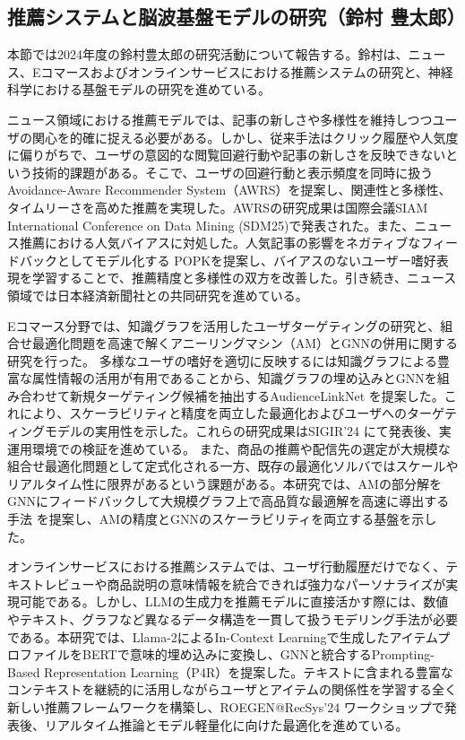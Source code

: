 
\subsection{推薦システムと脳波基盤モデルの研究（鈴村 豊太郎）}


本節では2024年度の鈴村豊太郎の研究活動について報告する。鈴村は、ニュース、Eコマースおよびオンラインサービスにおける推薦システムの研究と、神経科学における基盤モデルの研究を進めている。

ニュース領域における推薦モデルでは、記事の新しさや多様性を維持しつつユーザの関心を的確に捉える必要がある。しかし、従来手法はクリック履歴や人気度に偏りがちで、ユーザの意図的な閲覧回避行動や記事の新しさを反映できないという技術的課題がある。そこで、ユーザの回避行動と表示頻度を同時に扱う Avoidance-Aware Recommender System（AWRS）\cite{awrs}を提案し、関連性と多様性、タイムリーさを高めた推薦を実現した。AWRSの研究成果は国際会議SIAM International Conference on Data Mining (SDM25)で発表された。また、ニュース推薦における人気バイアスに対処した。人気記事の影響をネガティブなフィードバックとしてモデル化する POPKを提案し、バイアスのないユーザー嗜好表現を学習することで、推薦精度と多様性の双方を改善した。引き続き、ニュース領域では日本経済新聞社との共同研究を進めている。

Eコマース分野では、知識グラフを活用したユーザターゲティングの研究と、組合せ最適化問題を高速で解くアニーリングマシン（AM）とGNNの併用に関する研究を行った。
多様なユーザの嗜好を適切に反映するには知識グラフによる豊富な属性情報の活用が有用であることから、知識グラフの埋め込みとGNNを組み合わせて新規ターゲティング候補を抽出するAudienceLinkNet \cite{aln}を提案した。これにより、スケーラビリティと精度を両立した最適化およびユーザへのターゲティングモデルの実用性を示した。これらの研究成果はSIGIR’24 にて発表後、実運用環境での検証を進めている。
また、商品の推薦や配信先の選定が大規模な組合せ最適化問題として定式化される一方、既存の最適化ソルバではスケールやリアルタイム性に限界があるという課題がある。本研究では、AMの部分解をGNNにフィードバックして大規模グラフ上で高品質な最適解を高速に導出する手法 \cite{annealing-gnn}を提案し、AMの精度とGNNのスケーラビリティを両立する基盤を示した。

オンラインサービスにおける推薦システムでは、ユーザ行動履歴だけでなく、テキストレビューや商品説明の意味情報を統合できれば強力なパーソナライズが実現可能である。しかし、LLMの生成力を推薦モデルに直接活かす際には、数値やテキスト、グラフなど異なるデータ構造を一貫して扱うモデリング手法が必要である。本研究では、Llama-2によるIn-Context Learningで生成したアイテムプロファイルをBERTで意味的埋め込みに変換し、GNNと統合するPrompting-Based Representation Learning（P4R）\cite{p4r}を提案した。テキストに含まれる豊富なコンテキストを継続的に活用しながらユーザとアイテムの関係性を学習する全く新しい推薦フレームワークを構築し、ROEGEN@RecSys’24 ワークショップで発表後、リアルタイム推論とモデル軽量化に向けた最適化を進めている。


